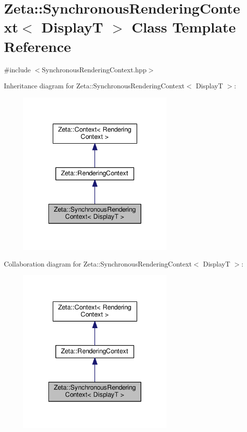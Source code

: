 \hypertarget{classZeta_1_1SynchronousRenderingContext}{\section{Zeta\+:\+:Synchronous\+Rendering\+Context$<$ Display\+T $>$ Class Template Reference}
\label{classZeta_1_1SynchronousRenderingContext}
}


{\ttfamily \#include $<$Synchronous\+Rendering\+Context.\+hpp$>$}



Inheritance diagram for Zeta\+:\+:Synchronous\+Rendering\+Context$<$ Display\+T $>$\+:\nopagebreak
\begin{figure}[H]
\begin{center}
\leavevmode
\includegraphics[width=222pt]{classZeta_1_1SynchronousRenderingContext__inherit__graph}
\end{center}
\end{figure}


Collaboration diagram for Zeta\+:\+:Synchronous\+Rendering\+Context$<$ Display\+T $>$\+:\nopagebreak
\begin{figure}[H]
\begin{center}
\leavevmode
\includegraphics[width=222pt]{classZeta_1_1SynchronousRenderingContext__coll__graph}
\end{center}
\end{figure}
